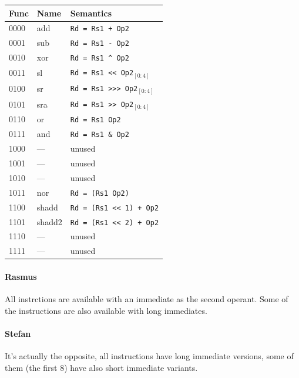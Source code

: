 \documentclass{IEEEtran}
\newcommand{\comment}[3]{\paragraph*{\textbf{#1}}{\color{#3}#2}}
\newcommand{\stefan}[1]{\comment{Stefan}{#1}{RoyalPurple}}
\newcommand{\rasmus}[1]{\comment{Rasmus}{#1}{Mahogany}}
\newcommand{\XOR}{\textasciicircum\xspace}
\newcommand{\OR}{\textbar\xspace}
\newcommand{\AND}{\&\xspace}
\newcommand{\NOT}{\texttildelow}
\newcommand{\shl}{\textless$\!$\textless\xspace}
\newcommand{\shr}{\textgreater$\!$\textgreater$\!$\textgreater\xspace}
\newcommand{\ashr}{\textgreater$\!$\textgreater\xspace}
\begin{document}
\begin{tabular}{lll}
  Func & Name   & Semantics \\ \hline
  \arrayrulecolor{gray}
  0000 & add    & \texttt{Rd = Rs1 + Op2} \\
  0001 & sub    & \texttt{Rd = Rs1 - Op2} \\
  0010 & xor    & \texttt{Rd = Rs1 \XOR Op2} \\
  0011 & sl     & \texttt{Rd = Rs1 \shl Op2$_{[0:4]}$} \\
  0100 & sr     & \texttt{Rd = Rs1 \shr Op2$_{[0:4]}$} \\
  0101 & sra    & \texttt{Rd = Rs1 \ashr Op2$_{[0:4]}$} \\
  0110 & or     & \texttt{Rd = Rs1 \OR Op2} \\
  0111 & and    & \texttt{Rd = Rs1 \AND Op2} \\ \hline
  1000 & ---	& unused \\
  1001 & ---    & unused \\
  1010 & ---    & unused \\
  1011 & nor    & \texttt{Rd = \NOT (Rs1 \OR Op2)} \\
  1100 & shadd  & \texttt{Rd = (Rs1 \shl 1) + Op2} \\
  1101 & shadd2 & \texttt{Rd = (Rs1 \shl 2) + Op2} \\
  \arrayrulecolor{black}
  1110 & ---    & unused \\
  1111 & ---    & unused \\ \hline
\end{tabular}

\rasmus{All instrctions are available with an immediate as the second operant.
Some of the instructions are also available with long immediates.}
\stefan{It's actually the opposite, all instructions have long immediate versions, some of them (the first 8) have also short immediate
variants.}
\end{document}
